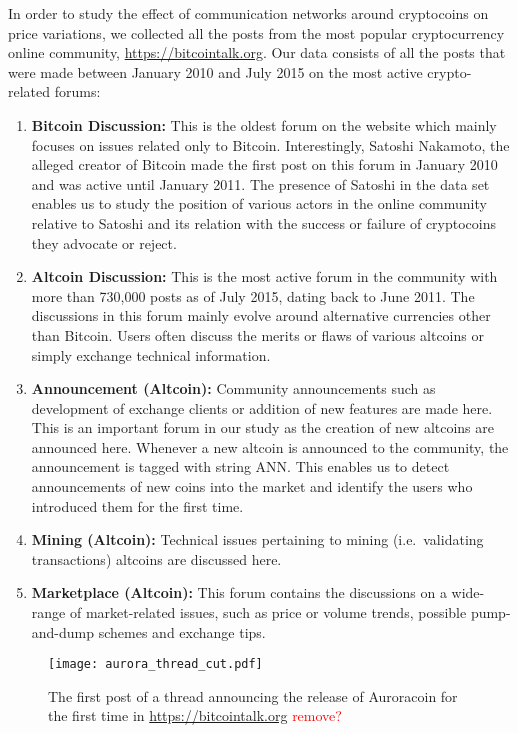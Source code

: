 In order to study the effect of communication networks around cryptocoins on
price variations, we collected all the posts from the most popular cryptocurrency
online community, \url{https://bitcointalk.org}.  Our data consists of all the posts that were
made between January 2010 and July 2015 on the most active crypto-related forums:
\begin{enumerate}[topsep=0pt,itemsep=-0.5ex,partopsep=1ex,parsep=1ex]
  \item \textbf{Bitcoin Discussion:} This is the oldest forum on the website which mainly focuses
    on issues related only to Bitcoin. Interestingly, Satoshi Nakamoto, the alleged
    creator of Bitcoin made the first post on this forum in January 2010 and
    was active until January 2011. The presence of Satoshi in the data set enables us
    to study the position of various actors in the online community relative to Satoshi
    and its relation with the success or failure of cryptocoins they advocate or reject.
  \item \textbf{Altcoin Discussion:} This is the most active forum in the community
    with more than 730,000 posts as of July 2015, dating back to June 2011.
    The discussions in this forum mainly evolve around alternative currencies
    other than Bitcoin. Users often discuss the merits or flaws of various
    altcoins or simply exchange technical information.
  \item \textbf{Announcement (Altcoin):} Community announcements such as development of 
    exchange clients or addition of new features are made here. This is an important forum
    in our study as the creation of new altcoins are announced here. Whenever a new
    altcoin is announced to the community, the announcement is tagged with string ANN.
    This enables us to detect announcements of new coins into the market and identify
    the users who introduced them for the first time.
  \item \textbf{Mining (Altcoin):} Technical issues pertaining to mining (i.e.~validating transactions)
    altcoins are discussed here.
  \item \textbf{Marketplace (Altcoin):} This forum contains the discussions on a wide-range of 
    market-related issues, such as price or volume trends, possible pump-and-dump schemes
    and exchange tips.
\end{enumerate}

\begin{figure}
\texttt{[image: aurora\_thread\_cut.pdf]}
\caption{The first post of a thread announcing the release of Auroracoin for the first time in \url{https://bitcointalk.org} \textcolor{red}{remove?}}
\label{aurora_thread}
\end{figure}


